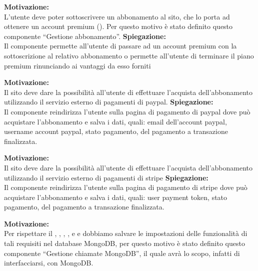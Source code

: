 \begin{listaPersonale}[ACI]{}
    \textbf{Motivazione:}\\
    L'utente deve poter sottoscrivere un abbonamento al sito, che lo porta ad ottenere un account premium (). Per questo motivo è stato definito questo componente “Gestione abbonamento”.
    \textbf{Spiegazione:}\\
    Il componente permette all'utente di passare ad un account premium con la sottoscrizione al relativo abbonamento o permette all'utente di terminare il piano premium rinunciando ai vantaggi da esso forniti



    \textbf{Motivazione:}\\
    Il sito deve dare la possibilità all'utente di effettuare l'acquista dell'abbonamento utilizzando il servizio esterno di pagamenti di paypal.
    \textbf{Spiegazione:}\\
    Il componente reindirizza l'utente sulla pagina di pagamento di paypal dove può acquistare l'abbonamento e salva i dati, quali: email dell'account paypal, username account paypal, stato pagamento, del pagamento a transazione finalizzata.


    \textbf{Motivazione:}\\
    Il sito deve dare la possibilità all'utente di effettuare l'acquista dell'abbonamento utilizzando il servizio esterno di pagamenti di stripe
    \textbf{Spiegazione:}\\
    Il componente reindirizza l'utente sulla pagina di pagamento di stripe dove può acquistare l'abbonamento e salva i dati, quali: user payment token, stato pagamento, del pagamento a transazione finalizzata.



    \textbf{Motivazione:}\\
    Per rispettare il ,  , , ,  e  e  dobbiamo salvare le impostazioni delle funzionalità di tali requisiti nel database MongoDB, per questo motivo è stato definito questo componente “Gestione chiamate MongoDB”, il quale avrà lo scopo, infatti di interfacciarsi, con MongoDB.


\end{listaPersonale}
